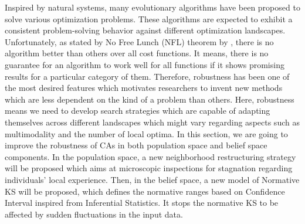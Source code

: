 \label{chapter:Exp}
Inspired by natural systems, many evolutionary algorithms have been proposed to solve various optimization problems. These algorithms are expected to exhibit a consistent problem-solving behavior against different optimization landscapes. Unfortunately, as stated by No Free Lunch (NFL) theorem by \citet{wolpert1997no}, there is no algorithm better than others over all cost functions. It means, there is no guarantee for an algorithm to work well for all functions if it shows promising results for a particular category of them. Therefore, robustness has been one of the most desired features which motivates researchers to invent new methods which are less dependent on the kind of a problem than others. Here, robustness means we need to develop search strategies which are capable of adapting themselves across different landscapes which might vary regarding aspects such as multimodality and the number of local optima. 
\newline
In this section, we are going to improve the robustness of CAs in both population space and belief space components. In the population space, a new neighborhood restructuring strategy will be proposed which aims at microscopic inspections for stagnation regarding individuals' local experience. Then, in the belief space, a new model of Normative KS will be proposed, which defines the normative ranges based on Confidence Interval inspired from Inferential Statistics. It stops the normative KS to be affected by sudden fluctuations in the input data.

